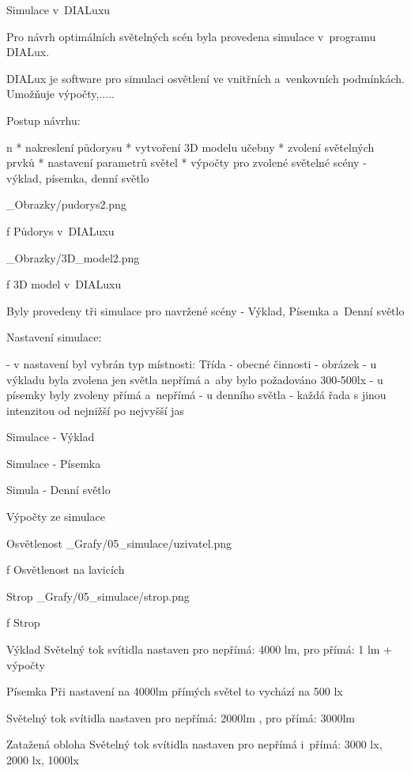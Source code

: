 \chap Simulace v~DIALuxu

Pro návrh optimálních světelných scén byla provedena simulace v~programu DIALux.

DIALux je software pro simulaci osvětlení ve vnitřních a~venkovních podmínkách. Umožňuje výpočty,.....

\medskip
Postup návrhu:

\begitems \style n
* nakreslení půdorysu
* vytvoření 3D modelu učebny
* zvolení světelných prvků
* nastavení parametrů světel
* výpočty pro zvolené světelné scény - výklad, písemka, denní světlo
\enditems
\medskip

\medskip {}
\picw=8cm _Obrazky/pudorys2.png
\caption/f Půdorys v~DIALuxu
\medskip

\medskip {}
\picw=8cm _Obrazky/3D_model2.png
\caption/f 3D model v~DIALuxu
\medskip

Byly provedeny tři simulace pro navržené scény - Výklad, Písemka a~Denní světlo

Nastavení simulace:

- v nastavení byl vybrán typ místnosti: Třída - obecné činnosti
- obrázek
- u výkladu byla zvolena jen světla nepřímá a~aby bylo požadováno 300-500lx
- u písemky byly zvoleny přímá a~nepřímá
- u denního světla - každá řada s jinou intenzitou od nejnižší po nejvyšší jas

\sec Simulace - Výklad

\sec Simulace - Písemka

\sec Simula - Denní světlo


Výpočty ze simulace

Osvětlenost
\medskip {}
\picw=15cm _Grafy/05_simulace/uzivatel.png
\caption/f Osvětlenost na lavicích
\medskip


Strop
\medskip {}
\picw=15cm _Grafy/05_simulace/strop.png
\caption/f Strop
\medskip



Výklad
Světelný tok svítidla nastaven pro nepřímá: 4000 lm, pro přímá: 1 lm
+ výpočty

Písemka
Při nastavení na 4000lm přímých světel to vychází na 500 lx

Světelný tok svítidla nastaven pro nepřímá: 2000lm , pro přímá: 3000lm

Zatažená obloha
Světelný tok svítidla nastaven pro nepřímá i~přímá: 3000 lx, 2000 lx, 1000lx
